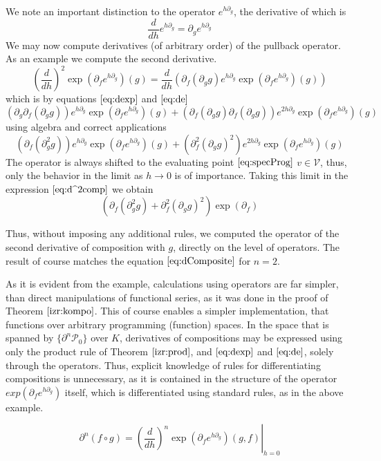 \documentclass[preprint,12pt]{elsarticle}
\newcommand{\VV}{\mathcal{V}}
\newcommand{\dP}{\mathcal{P}}
\newcommand{\D}{\partial}
\begin{document}
 We note an important distinction to the operator $e^{h\D_g}$, the derivative of which is
 \begin{equation}\label{eq:de}
\frac{d}{dh}e^{h\D_g}=\D_ge^{h\D_g}
 \end{equation}
 We may now compute derivatives (of arbitrary order) of the pullback operator. As an example we compute the second derivative.
 $$\left(\frac{d}{dh}\right)^2\exp\left(\D_fe^{h\D_g}\right)(g)=\frac{d}{dh}\left(\D_f(\D_gg)e^{h\D_g}\exp\left(\D_fe^{h\D_g}\right)(g)\right)$$
 which is by equations $\eqref{eq:dexp}$ and $\eqref{eq:de}$
 $$(\D_g\D_f(\D_gg))e^{h\D_g}\exp(\D_fe^{h\D_g})(g)+(\D_f(\D_gg)\D_f(\D_gg))e^{2h\D_g}\exp(\D_fe^{h\D_g})(g)$$
 using algebra and correct applications
 \begin{equation}\label{eq:d^2comp}
 \left(\D_f(\D^2_gg)\right)e^{h\D_g}\exp(\D_fe^{h\D_g})(g)+(\D^2_f(\D_gg)^2)e^{2h\D_g}\exp(\D_fe^{h\D_g})(g)
 \end{equation}
 The operator is always shifted to the evaluating point $\eqref{eq:specProg}$ $v\in \VV$, thus, only the behavior in the limit as $h\to 0$ is of importance. Taking this limit in the expression $\eqref{eq:d^2comp}$ we obtain
 \begin{equation}
	\left(\D_f(\D^2_gg)+\D^2_f(\D_gg)^2\right)\exp(\D_f)
 \end{equation}
 
 Thus, without imposing any additional rules, we computed the operator of the second derivative of composition with $g$, directly on the level of operators. The result of course matches the equation $\eqref{eq:dComposite}$ for $n=2$.
 
 As it is evident from the example, calculations using operators are far simpler, than direct manipulations of functional series, as it was done in the proof of Theorem $\ref{izr:kompo}$. This of course enables a simpler implementation, that functions over arbitrary programming (function) spaces. In the space that is spanned by $\{\D^n\dP_0\}$ over $K$, derivatives of compositions may be expressed using only the product rule of Theorem $\ref{izr:prod}$, and $\eqref{eq:dexp}$ and $\eqref{eq:de}$, solely through the operators. Thus, explicit knowledge of rules for differentiating compositions is unnecessary, as it is contained in the structure of the operator $exp(\D_fe^{h\D_g})$ itself, which is differentiated using standard rules, as in the above example.
 
 \begin{equation}\label{eq:dkompo}
 \D^n(f\circ g)=\left.\left(\frac{d}{dh}\right)^n\exp\left(\D_fe^{h\D_g}\right)(g,f)\right|_{h=0}
 \end{equation}
 
\end{document}
